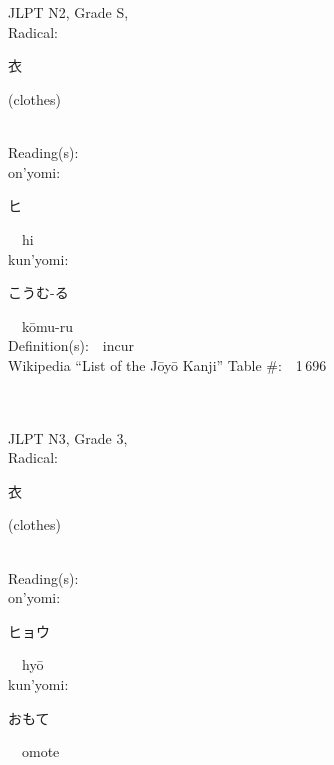 \begin{multicols}{2}
\ \ \\
{\fontsize{34pt}{40pt}  }\ \ \\  %
{JLPT N2, Grade S, \\Radical:\ \ {\begin{CJK}{UTF8}{min} 衣 \end{CJK}} (clothes) } \\
Reading(s):\ \ \\
{\hspace*{1em}}on'yomi:\ \ \\
{\hspace*{2em}}{\begin{CJK}{UTF8}{min} ヒ \end{CJK}}\ \ hi\ \ \\
{\hspace*{1em}}kun'yomi:\ \ \\
{\hspace*{2em}}{\begin{CJK}{UTF8}{min} こうむ-る \end{CJK}}\ \ k\=omu-ru\ \ \\
Definition(s):\ \ incur \\
Wikipedia ``List of the J\=oy\=o Kanji'' Table \#:\ \ 1\,696 \\
\ \ \\
{\fontsize{34pt}{40pt}  }\ \ \\  %
{JLPT N3, Grade 3, \\Radical:\ \ {\begin{CJK}{UTF8}{min} 衣 \end{CJK}} (clothes) } \\
Reading(s):\ \ \\
{\hspace*{1em}}on'yomi:\ \ \\
{\hspace*{2em}}{\begin{CJK}{UTF8}{min} ヒョウ \end{CJK}}\ \ hy\=o\ \ \\
{\hspace*{1em}}kun'yomi:\ \ \\
{\hspace*{2em}}{\begin{CJK}{UTF8}{min} おもて \end{CJK}}\ \ omote\ \ \\

\end{multicols}
